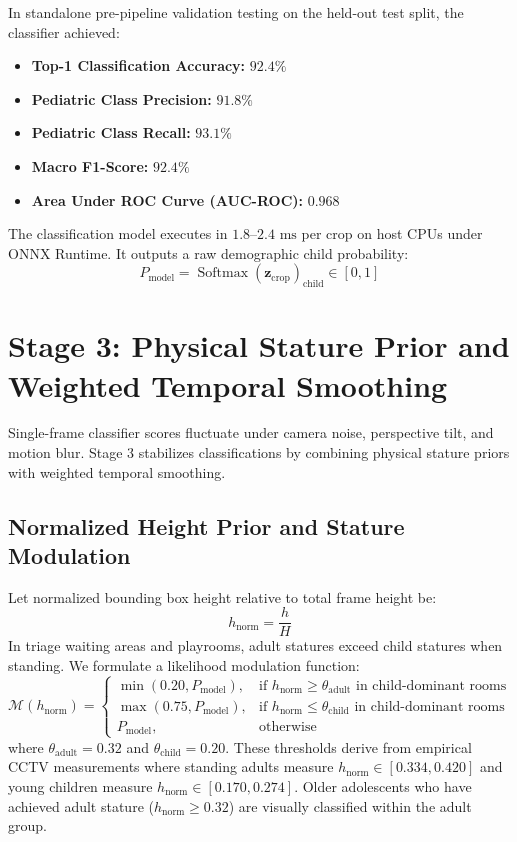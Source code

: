 In standalone pre-pipeline validation testing on the held-out test split, the classifier achieved:
\begin{itemize}
    \item \textbf{Top-1 Classification Accuracy:} $92.4\%$
    \item \textbf{Pediatric Class Precision:} $91.8\%$
    \item \textbf{Pediatric Class Recall:} $93.1\%$
    \item \textbf{Macro F1-Score:} $92.4\%$
    \item \textbf{Area Under ROC Curve (AUC-ROC):} $0.968$
\end{itemize}
The classification model executes in $1.8\text{--}2.4\text{ ms}$ per crop on host CPUs under ONNX Runtime. It outputs a raw demographic child probability:
\begin{equation}
    P_{\text{model}} = \operatorname{Softmax}(\mathbf{z}_{\text{crop}})_{\text{child}} \in [0, 1]
\end{equation}

\section{Stage 3: Physical Stature Prior and Weighted Temporal Smoothing}
Single-frame classifier scores fluctuate under camera noise, perspective tilt, and motion blur. Stage 3 stabilizes classifications by combining physical stature priors with weighted temporal smoothing.

\subsection{Normalized Height Prior and Stature Modulation}
Let normalized bounding box height relative to total frame height be:
\begin{equation}
    h_{\text{norm}} = \frac{h}{H}
\end{equation}
In triage waiting areas and playrooms, adult statures exceed child statures when standing. We formulate a likelihood modulation function:
\begin{equation}
    \mathcal{M}(h_{\text{norm}}) = \begin{cases}
    \min(0.20, P_{\text{model}}), & \text{if } h_{\text{norm}} \ge \theta_{\text{adult}} \text{ in child-dominant rooms} \\
    \max(0.75, P_{\text{model}}), & \text{if } h_{\text{norm}} \le \theta_{\text{child}} \text{ in child-dominant rooms} \\
    P_{\text{model}}, & \text{otherwise}
    \end{cases}
\end{equation}
where $\theta_{\text{adult}} = 0.32$ and $\theta_{\text{child}} = 0.20$. These thresholds derive from empirical CCTV measurements where standing adults measure $h_{\text{norm}} \in [0.334, 0.420]$ and young children measure $h_{\text{norm}} \in [0.170, 0.274]$. Older adolescents who have achieved adult stature ($h_{\text{norm}} \ge 0.32$) are visually classified within the adult group.

